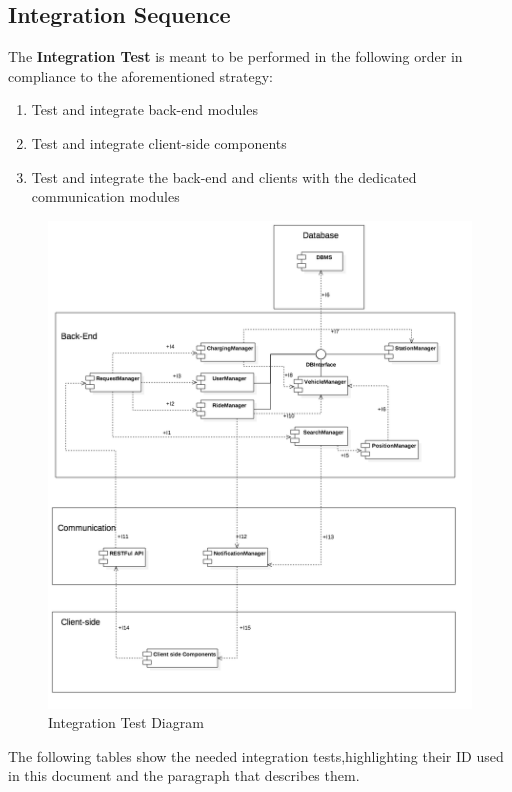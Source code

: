 \subsection{Integration Sequence}
\label{sub:IntSeq}
The \textbf{Integration Test} is meant to be performed in the following order in compliance to the aforementioned  strategy:

\begin{enumerate}
\item Test and integrate back-end modules
\item Test and integrate client-side components
\item Test and integrate the back-end and clients with the dedicated communication
modules
\end{enumerate}
\clearpage


\FloatBarrier
\begin{figure}
\centering
\caption{Integration Test Diagram}
\includegraphics[scale=0.45]{Images/Diagram3.png}
\end{figure}
\FloatBarrier
\newpage

The following tables show the needed integration tests,highlighting their ID used in this document and the paragraph that describes them.\\
\FloatBarrier
